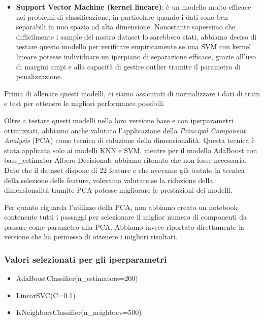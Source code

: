 \documentclass{article}
\begin{document}
\begin{multicols}{2}
\begin{itemize}[leftmargin=*]
    \item \textbf{Support Vector Machine (kernel lineare)}: è un modello molto efficace nei problemi di classificazione, in particolare quando i dati sono ben separabili in uno spazio ad alta dimensione. Nonostante sapessimo che difficilmente i sample del nostro dataset lo sarebbero stati, abbiamo deciso di testare questo modello per verificare empiricamente se una SVM con kernel lineare potesse individuare un iperpiano di separazione efficace, grazie all’uso di margini ampi e alla capacità di gestire outlier tramite il parametro di penalizzazione.
\end{itemize}

Prima di allenare questi modelli, ci siamo assicurati di normalizzare i dati di train e test per ottenere le migliori performance possibili.

Oltre a testare questi modelli nella loro versione base e con iperparametri ottimizzati, abbiamo anche valutato l'applicazione della \textit{Principal Component Analysis} (PCA) come tecnica di riduzione della dimensionalità. Questa tecnica è stata applicata solo ai modelli KNN e SVM, mentre per il modello AdaBoost con base\_estimator Albero Decisionale abbiamo ritenuto che non fosse necessaria. Dato che il dataset dispone di 22 feature e che avevamo già testato la tecnica della selezione delle feature, volevamo valutare se la riduzione della dimensionalità tramite PCA potesse migliorare le prestazioni dei modelli. 

Per quanto riguarda l’utilizzo della PCA, non abbiamo creato un notebook contenente tutti i passaggi per selezionare il miglior numero di componenti da passare come parametro alla PCA. Abbiamo invece riportato direttamente la versione che ha permesso di ottenere i migliori risultati.

\subsubsection*{Valori selezionati per gli iperparametri}

\begin{itemize}[leftmargin=*]
    \item AdaBoostClassifier(n\_estimators=200)
    \item LinearSVC(C=0.1)
    \item KNeighborsClassifier(n\_neighbors=500)
\end{itemize}



\end{multicols}
\end{document}
